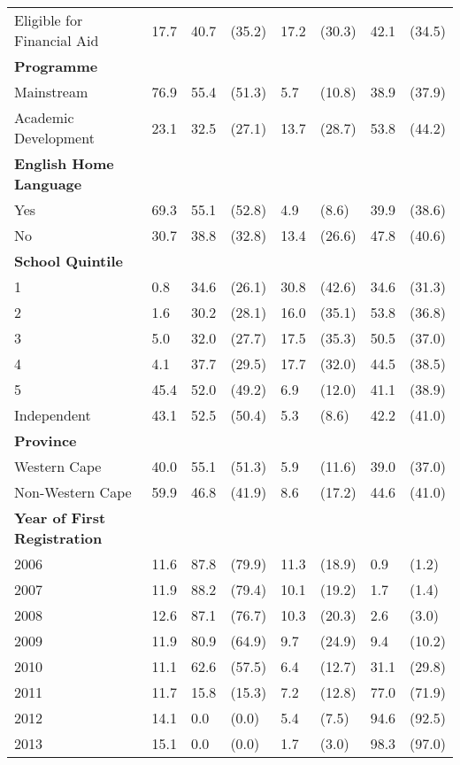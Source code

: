 \begin{longtable}{L{2.5cm}C{2.5cm}C{1cm}C{1.5cm}C{1cm}C{1.5cm}C{1cm}C{1.5cm}}
Eligible for Financial Aid & 17.7 & 40.7 & (35.2) & 17.2 & (30.3) & 42.1 & (34.5) \\
\addlinespace
\bfseries Programme \\
Mainstream & 76.9 & 55.4 & (51.3) & 5.7 & (10.8) & 38.9 & (37.9) \\
Academic Development & 23.1 & 32.5 & (27.1) & 13.7 & (28.7) & 53.8 & (44.2) \\
\addlinespace
\bfseries English Home Language \\
Yes & 69.3 & 55.1 & (52.8) & 4.9 & (8.6) & 39.9 & (38.6) \\
No & 30.7 & 38.8 & (32.8) & 13.4 & (26.6) & 47.8 & (40.6) \\
\addlinespace
\bfseries School Quintile \\
1 & 0.8 & 34.6 & (26.1) & 30.8 & (42.6) & 34.6 & (31.3) \\
2 & 1.6 & 30.2 & (28.1) & 16.0 & (35.1) & 53.8 & (36.8) \\
3 & 5.0 & 32.0 & (27.7) & 17.5 & (35.3) & 50.5 & (37.0) \\
4 & 4.1 & 37.7 & (29.5) & 17.7 & (32.0) & 44.5 & (38.5) \\
5 & 45.4 & 52.0 & (49.2) & 6.9 & (12.0) & 41.1 & (38.9) \\
Independent  & 43.1 & 52.5 & (50.4) & 5.3 & (8.6) & 42.2 & (41.0) \\
\addlinespace
{\bfseries Province} \\
Western Cape & 40.0 & 55.1 & (51.3) &5.9 & (11.6) &39.0 & (37.0) \\
Non-Western Cape & 59.9 & 46.8 & (41.9) & 8.6 & (17.2) & 44.6 & (41.0) \\
\addlinespace
{\bfseries Year of First Registration} \\
{2006} & 11.6  & 87.8 & (79.9) & 11.3 & (18.9) & 0.9 & (1.2) \\
{2007} & 11.9 & 88.2 & (79.4) & 10.1 & (19.2)   & 1.7 & (1.4) \\
{2008} & 12.6 & 87.1 & (76.7) & 10.3 & (20.3) & 2.6 & (3.0) \\
{2009} & 11.9 & 80.9 & (64.9) & 9.7 & (24.9) & 9.4 & (10.2) \\
{2010} & 11.1 & 62.6 & (57.5) & 6.4 & (12.7) & 31.1 & (29.8) \\
{2011} & 11.7 & 15.8 & (15.3) & 7.2 & (12.8) & 77.0 & (71.9) \\
{2012} & 14.1 & 0.0 & (0.0)  & 5.4 & (7.5) & 94.6 & (92.5) \\
{2013} & 15.1 & 0.0 & (0.0) & 1.7 & (3.0) & 98.3 & (97.0) \\
\end{longtable}


